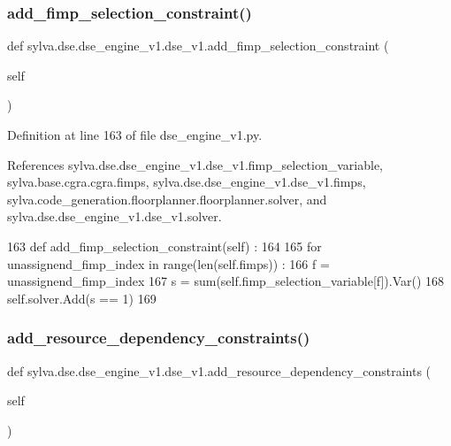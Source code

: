 \subsubsection{\texorpdfstring{add\+\_\+fimp\+\_\+selection\+\_\+constraint()}{add\_fimp\_selection\_constraint()}}
{\footnotesize\ttfamily def sylva.\+dse.\+dse\+\_\+engine\+\_\+v1.\+dse\+\_\+v1.\+add\+\_\+fimp\+\_\+selection\+\_\+constraint (\begin{DoxyParamCaption}\item[{}]{self }\end{DoxyParamCaption})}



Definition at line 163 of file dse\+\_\+engine\+\_\+v1.\+py.



References sylva.\+dse.\+dse\+\_\+engine\+\_\+v1.\+dse\+\_\+v1.\+fimp\+\_\+selection\+\_\+variable, sylva.\+base.\+cgra.\+cgra.\+fimps, sylva.\+dse.\+dse\+\_\+engine\+\_\+v1.\+dse\+\_\+v1.\+fimps, sylva.\+code\+\_\+generation.\+floorplanner.\+floorplanner.\+solver, and sylva.\+dse.\+dse\+\_\+engine\+\_\+v1.\+dse\+\_\+v1.\+solver.


\begin{DoxyCode}
163   \textcolor{keyword}{def }add\_fimp\_selection\_constraint(self) :
164 
165     \textcolor{keywordflow}{for} unassignend\_fimp\_index \textcolor{keywordflow}{in} range(len(self.fimps)) :
166       f = unassignend\_fimp\_index
167       s = sum(self.fimp\_selection\_variable[f]).Var()
168       self.solver.Add(s == 1)
169 
\end{DoxyCode}
\mbox{\label{classsylva_1_1dse_1_1dse__engine__v1_1_1dse__v1_adb128ff5951fd6ee31c3709546491033}} 
\subsubsection{\texorpdfstring{add\+\_\+resource\+\_\+dependency\+\_\+constraints()}{add\_resource\_dependency\_constraints()}}
{\footnotesize\ttfamily def sylva.\+dse.\+dse\+\_\+engine\+\_\+v1.\+dse\+\_\+v1.\+add\+\_\+resource\+\_\+dependency\+\_\+constraints (\begin{DoxyParamCaption}\item[{}]{self }\end{DoxyParamCaption})}




